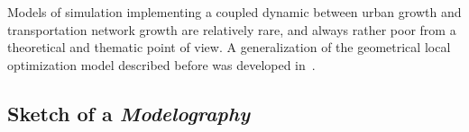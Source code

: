 Models of simulation implementing a coupled dynamic between urban growth and transportation network growth are relatively rare, and always rather poor from a theoretical and thematic point of view. A generalization of the geometrical local optimization model described before was developed in~\cite{barthelemy2009co}. %



\subsection{Sketch of a \emph{Modelography}}










